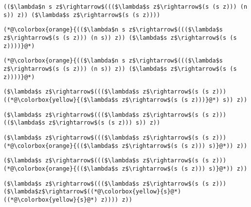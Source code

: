 \documentclass{beamer}
\begin{document}
\begin{frame}[fragile]{\CurrentSection}
\lstset{basicstyle=\ttfamily\small}\lstset{numbers=none}\lstset{language=ML}\begin{lstlisting}
(($\lambda$n s z$\rightarrow$((($\lambda$s z$\rightarrow$(s (s z))) (n s)) z)) ($\lambda$s z$\rightarrow$(s (s z))))
\end{lstlisting}
\pause\lstset{language=ML}\begin{lstlisting}
(*@\colorbox{orange}{(($\lambda$n s z$\rightarrow$((($\lambda$s z$\rightarrow$(s (s z))) (n s)) z)) ($\lambda$s z$\rightarrow$(s (s z))))}@*)
\end{lstlisting}

\end{frame}

\begin{frame}[fragile]{\CurrentSection}
\lstset{basicstyle=\ttfamily\small}\lstset{numbers=none}\lstset{language=ML}\begin{lstlisting}
(*@\colorbox{orange}{(($\lambda$n s z$\rightarrow$((($\lambda$s z$\rightarrow$(s (s z))) (n s)) z)) ($\lambda$s z$\rightarrow$(s (s z))))}@*)
\end{lstlisting}
\pause\lstset{language=ML}\begin{lstlisting}
($\lambda$s z$\rightarrow$((($\lambda$s z$\rightarrow$(s (s z))) ((*@\colorbox{yellow}{($\lambda$s z$\rightarrow$(s (s z)))}@*) s)) z))
\end{lstlisting}

\end{frame}

\begin{frame}[fragile]{\CurrentSection}
\lstset{basicstyle=\ttfamily\small}\lstset{numbers=none}\lstset{language=ML}\begin{lstlisting}
($\lambda$s z$\rightarrow$((($\lambda$s z$\rightarrow$(s (s z))) (($\lambda$s z$\rightarrow$(s (s z))) s)) z))
\end{lstlisting}
\pause\lstset{language=ML}\begin{lstlisting}
($\lambda$s z$\rightarrow$((($\lambda$s z$\rightarrow$(s (s z))) (*@\colorbox{orange}{(($\lambda$s z$\rightarrow$(s (s z))) s)}@*)) z))
\end{lstlisting}

\end{frame}

\begin{frame}[fragile]{\CurrentSection}
\lstset{basicstyle=\ttfamily\small}\lstset{numbers=none}\lstset{language=ML}\begin{lstlisting}
($\lambda$s z$\rightarrow$((($\lambda$s z$\rightarrow$(s (s z))) (*@\colorbox{orange}{(($\lambda$s z$\rightarrow$(s (s z))) s)}@*)) z))
\end{lstlisting}
\pause\lstset{language=ML}\begin{lstlisting}
($\lambda$s z$\rightarrow$((($\lambda$s z$\rightarrow$(s (s z))) ($\lambda$z$\rightarrow$((*@\colorbox{yellow}{s}@*) ((*@\colorbox{yellow}{s}@*) z)))) z))
\end{lstlisting}

\end{frame}
\end{document}
